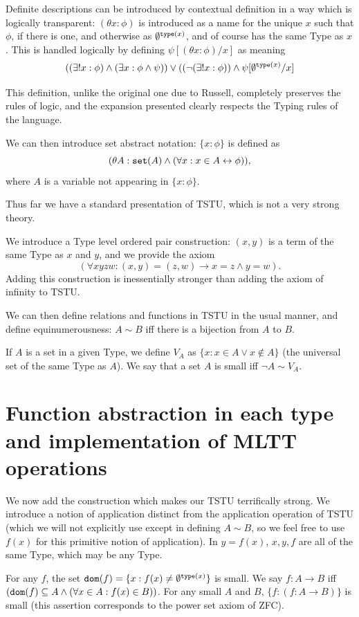 \documentclass[12pt]{article}
\begin{document}
Definite descriptions can be introduced by contextual definition in a way which is logically transparent:  $(\theta x:\phi)$ is introduced as a name for the unique $x$ such that $\phi$, if there is one,
and otherwise as $\emptyset^{{\tt type}(x)}$, and of course has the same Type as $x$. This is handled logically by defining $\psi[(\theta x:\phi)/x]$ as meaning $$((\exists! x:\phi) \wedge (\exists x:\phi \wedge \psi)) \vee ((\neg(\exists!x:\phi) ) \wedge \psi[\emptyset^{{\tt type}(x)}/x]$$

This definition, unlike the original one due to Russell, completely preserves the rules of logic, and the expansion presented clearly respects the Typing rules of the language.

We can then introduce set abstract notation:  $\{x:\phi\}$ is defined as $$(\theta A:{\tt set}(A) \wedge (\forall x:x \in A \leftrightarrow \phi)),$$ where $A$ is a variable not appearing in $\{x:\phi\}$.

Thus far we have a standard presentation of TSTU, which is not a very strong theory.

We introduce a Type level ordered pair construction:  $(x,y)$ is a term of the same Type as $x$ and $y$, and we provide the axiom $$(\forall xyzw:(x,y) = (z,w) \rightarrow x=z \wedge y=w).$$  Adding this construction is inessentially stronger than adding the axiom of infinity to TSTU.

We can then define relations and functions in TSTU in the usual manner, and define  equinumerousness:  $A \sim B$ iff there is a bijection from $A$ to $B$.

If $A$ is a set in a given Type, we define $V_A$ as $\{x:x \in A \vee x \not\in A\}$ (the universal set of the same Type as $A$).  We say that a set $A$ is small iff $\neg A \sim V_A$.

\section{Function abstraction in each type and implementation of MLTT operations}

We now add the construction which makes our TSTU terrifically strong.  We introduce a notion of application distinct from the application operation of TSTU (which we will not explicitly use except in defining
$A \sim B$, so we feel free to use $f(x)$ for this primitive notion of application).  In $y=f(x)$, $x,y,f$ are all of the same Type, which may be any Type.  

For any $f$, the set ${\tt dom}(f) = \{x:f(x) \neq \emptyset^{{\tt type}(x)}\}$ is small.  We say $f:A \rightarrow B$ iff $({\tt dom}(f) \subseteq A \wedge (\forall x \in A:f(x)\in B))$.  For any small $A$ and $B$,
$\{f:(f:A \rightarrow B)\}$ is small (this assertion corresponds to the power set axiom of ZFC).
\end{document}
